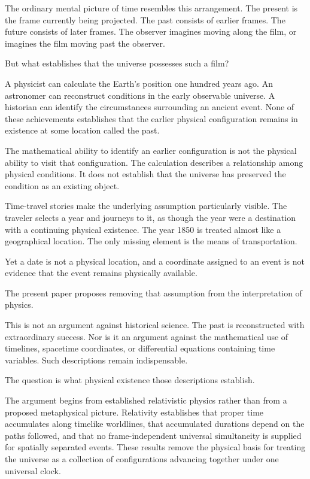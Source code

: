 \documentclass[12pt,onecolumn]{article}
\begin{document}
The ordinary mental picture of time resembles this arrangement. The present is the frame currently being projected. The past consists of earlier frames. The future consists of later frames. The observer imagines moving along the film, or imagines the film moving past the observer.

But what establishes that the universe possesses such a film?

A physicist can calculate the Earth's position one hundred years ago. An astronomer can reconstruct conditions in the early observable universe. A historian can identify the circumstances surrounding an ancient event. None of these achievements establishes that the earlier physical configuration remains in existence at some location called the past.

The mathematical ability to identify an earlier configuration is not the physical ability to visit that configuration. The calculation describes a relationship among physical conditions. It does not establish that the universe has preserved the condition as an existing object.

Time-travel stories make the underlying assumption particularly visible. The traveler selects a year and journeys to it, as though the year were a destination with a continuing physical existence. The year 1850 is treated almost like a geographical location. The only missing element is the means of transportation.

Yet a date is not a physical location, and a coordinate assigned to an event is not evidence that the event remains physically available.

The present paper proposes removing that assumption from the interpretation of physics.

This is not an argument against historical science. The past is reconstructed with extraordinary success. Nor is it an argument against the mathematical use of timelines, spacetime coordinates, or differential equations containing time variables. Such descriptions remain indispensable.

The question is what physical existence those descriptions establish.

The argument begins from established relativistic physics rather than from a proposed metaphysical picture. Relativity establishes that proper time accumulates along timelike worldlines, that accumulated durations depend on the paths followed, and that no frame-independent universal simultaneity is supplied for spatially separated events. These results remove the physical basis for treating the universe as a collection of configurations advancing together under one universal clock.
\end{document}
